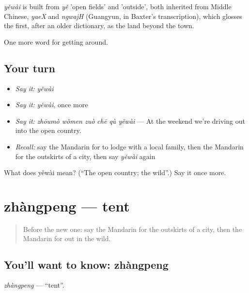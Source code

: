 \begin{cousinweb}
\emph{yěwài} is built from \emph{yě} 'open fields' and  'outside', both inherited from Middle Chinese, \emph{yaeX} and \emph{ngwajH} (Guangyun, in Baxter's transcription), which glosses the first, after an older dictionary, as the land beyond the town.
\end{cousinweb}

\begin{grammarlens}[title={What you've built}]
One more word for getting around.
\end{grammarlens}

\subsection*{Your turn}
\begin{itemize}
\raggedright
  \item \emph{Say it:} \emph{yěwài}
  \item \emph{Say it:} \emph{yěwài}, once more
  \item \emph{Say it:} \emph{zhōumò wǒmen zuò chē qù yěwài} — At the weekend we're driving out into the open country.
  \item \emph{Recall:} say the Mandarin for to lodge with a local family, then the Mandarin for the outskirts of a city, then say \emph{yěwài} again
\end{itemize}

\begin{tcolorbox}[breakable,colback=teal!4,colframe=teal!35!black,title={Before you move on}]
What does yěwài mean? (\textquotedblleft{}The open country; the wild\textquotedblright{}.) Say it once more.
\end{tcolorbox}
\section[zhàngpeng]{zhàngpeng — tent}

\label{lesson:ZH-C441-zhangpeng}



\begin{quote}
Before the new one: say the Mandarin for the outskirts of a city, then the Mandarin for out in the wild.
\end{quote}

\subsection*{You'll want to know: zhàngpeng}
\emph{zhàngpeng} — \textquotedblleft{}tent\textquotedblright{}.

